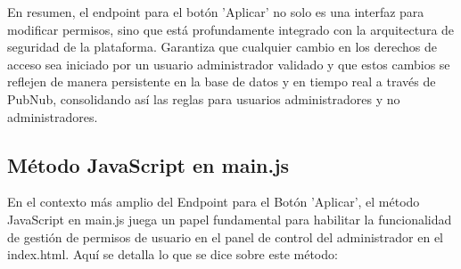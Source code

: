 \documentclass{report}
\begin{document}
En resumen, el endpoint para el botón 'Aplicar' no solo es una interfaz para modificar permisos, sino que está profundamente integrado con la 
arquitectura de seguridad de la plataforma. Garantiza que cualquier cambio en los derechos de acceso sea iniciado por un usuario administrador 
validado y que estos cambios se reflejen de manera persistente en la base de datos y en tiempo real a través de PubNub, consolidando así las 
reglas para usuarios administradores y no administradores.

\subsection{Método JavaScript en \textbf{main.js}}
En el contexto más amplio del Endpoint para el Botón 'Aplicar', el método JavaScript en main.js juega un papel fundamental para habilitar 
la funcionalidad de gestión de permisos de usuario en el panel de control del administrador en el index.html.
Aquí se detalla lo que se dice sobre este método:
\end{document}
